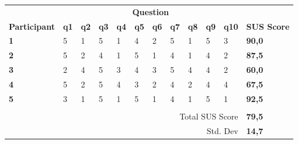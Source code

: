 \begin{table}[ht]
    \centering
    \begin{tabular}{llllllllllll}
    \rowcolor[HTML]{FFFFFF} 
                         & \multicolumn{10}{c}{\cellcolor[HTML]{FFFFFF}\textbf{Question}}                                                                             & \textbf{}          \\
    \rowcolor[HTML]{FFFFFF} 
    \textbf{Participant} & \textbf{q1} & \textbf{q2} & \textbf{q3} & \textbf{q4} & \textbf{q5} & \textbf{q6} & \textbf{q7} & \textbf{q8} & \textbf{q9} & \textbf{q10} & \textbf{SUS Score} \\
    \rowcolor[HTML]{FFFFFF} 
    \textbf{1}           & 5           & 1           & 5           & 1           & 4           & 2           & 5           & 1           & 5           & 3            & \textbf{90,0}      \\
    \rowcolor[HTML]{FFFFFF} 
    \textbf{2}           & 5           & 2           & 4           & 1           & 5           & 1           & 4           & 1           & 4           & 2            & \textbf{87,5}      \\
    \rowcolor[HTML]{FFFFFF} 
    \textbf{3}           & 2           & 4           & 5           & 3           & 4           & 3           & 5           & 4           & 4           & 2            & \textbf{60,0}      \\
    \rowcolor[HTML]{FFFFFF} 
    \textbf{4}           & 5           & 2           & 5           & 4           & 3           & 2           & 4           & 2           & 4           & 4            & \textbf{67,5}      \\
    \rowcolor[HTML]{FFFFFF} 
    \textbf{5}           & 3           & 1           & 5           & 1           & 5           & 1           & 4           & 1           & 5           & 1            & \textbf{92,5}      \\
    \rowcolor[HTML]{FFFFFF} 
                         & \multicolumn{10}{l}{\cellcolor[HTML]{FFFFFF}}                                                                                              & \textbf{}          \\
    \rowcolor[HTML]{FFFFFF} 
                         & \multicolumn{10}{r}{\cellcolor[HTML]{FFFFFF}Total SUS Score}                                                                               & \textbf{79,5}      \\
    \rowcolor[HTML]{FFFFFF} 
                         & \multicolumn{10}{r}{\cellcolor[HTML]{FFFFFF}Std. Dev}                                                                                      & \textbf{14,7}      \\

\end{tabular}
\end{table}
